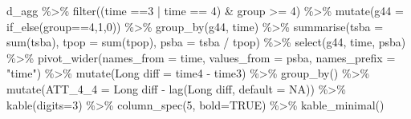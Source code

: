 \documentclass[
]{article}
\newenvironment{Shaded}{\begin{snugshade}}{\end{snugshade}}
\newcommand{\AttributeTok}[1]{\textcolor[rgb]{0.77,0.63,0.00}{#1}}
\newcommand{\ConstantTok}[1]{\textcolor[rgb]{0.00,0.00,0.00}{#1}}
\newcommand{\DecValTok}[1]{\textcolor[rgb]{0.00,0.00,0.81}{#1}}
\newcommand{\FunctionTok}[1]{\textcolor[rgb]{0.00,0.00,0.00}{#1}}
\newcommand{\NormalTok}[1]{#1}
\newcommand{\OtherTok}[1]{\textcolor[rgb]{0.56,0.35,0.01}{#1}}
\newcommand{\SpecialCharTok}[1]{\textcolor[rgb]{0.00,0.00,0.00}{#1}}
\newcommand{\StringTok}[1]{\textcolor[rgb]{0.31,0.60,0.02}{#1}}
\begin{document}
\begin{Shaded}
\begin{Highlighting}[]
\NormalTok{d\_agg }\SpecialCharTok{\%\textgreater{}\%} \FunctionTok{filter}\NormalTok{((time }\SpecialCharTok{==}\DecValTok{3} \SpecialCharTok{|}\NormalTok{ time }\SpecialCharTok{==} \DecValTok{4}\NormalTok{) }\SpecialCharTok{\&}\NormalTok{ group }\SpecialCharTok{\textgreater{}=} \DecValTok{4}\NormalTok{) }\SpecialCharTok{\%\textgreater{}\%}
  \FunctionTok{mutate}\NormalTok{(}\AttributeTok{g44 =} \FunctionTok{if\_else}\NormalTok{(group}\SpecialCharTok{==}\DecValTok{4}\NormalTok{,}\DecValTok{1}\NormalTok{,}\DecValTok{0}\NormalTok{)) }\SpecialCharTok{\%\textgreater{}\%}
  \FunctionTok{group\_by}\NormalTok{(g44, time) }\SpecialCharTok{\%\textgreater{}\%}
  \FunctionTok{summarise}\NormalTok{(}\AttributeTok{tsba =} \FunctionTok{sum}\NormalTok{(tsba),}
            \AttributeTok{tpop =} \FunctionTok{sum}\NormalTok{(tpop),}
            \AttributeTok{psba =}\NormalTok{ tsba }\SpecialCharTok{/}\NormalTok{ tpop) }\SpecialCharTok{\%\textgreater{}\%}
  \FunctionTok{select}\NormalTok{(g44, time, psba) }\SpecialCharTok{\%\textgreater{}\%}
  \FunctionTok{pivot\_wider}\NormalTok{(}\AttributeTok{names\_from =}\NormalTok{ time, }\AttributeTok{values\_from =}\NormalTok{ psba,}
              \AttributeTok{names\_prefix =} \StringTok{"time"}\NormalTok{) }\SpecialCharTok{\%\textgreater{}\%}
  \FunctionTok{mutate}\NormalTok{(}\StringTok{\textasciigrave{}}\AttributeTok{Long diff}\StringTok{\textasciigrave{}} \OtherTok{=} \StringTok{\textasciigrave{}}\AttributeTok{time4}\StringTok{\textasciigrave{}} \SpecialCharTok{{-}} \StringTok{\textasciigrave{}}\AttributeTok{time3}\StringTok{\textasciigrave{}}\NormalTok{) }\SpecialCharTok{\%\textgreater{}\%}
  \FunctionTok{group\_by}\NormalTok{() }\SpecialCharTok{\%\textgreater{}\%}
  \FunctionTok{mutate}\NormalTok{(}\AttributeTok{ATT\_4\_4 =} \StringTok{\textasciigrave{}}\AttributeTok{Long diff}\StringTok{\textasciigrave{}} \SpecialCharTok{{-}} \FunctionTok{lag}\NormalTok{(}\StringTok{\textasciigrave{}}\AttributeTok{Long diff}\StringTok{\textasciigrave{}}\NormalTok{, }\AttributeTok{default =} \ConstantTok{NA}\NormalTok{)) }\SpecialCharTok{\%\textgreater{}\%}
  \FunctionTok{kable}\NormalTok{(}\AttributeTok{digits=}\DecValTok{3}\NormalTok{) }\SpecialCharTok{\%\textgreater{}\%}
  \FunctionTok{column\_spec}\NormalTok{(}\DecValTok{5}\NormalTok{, }\AttributeTok{bold=}\ConstantTok{TRUE}\NormalTok{) }\SpecialCharTok{\%\textgreater{}\%}
  \FunctionTok{kable\_minimal}\NormalTok{()}
\end{Highlighting}
\end{Shaded}
\end{document}
